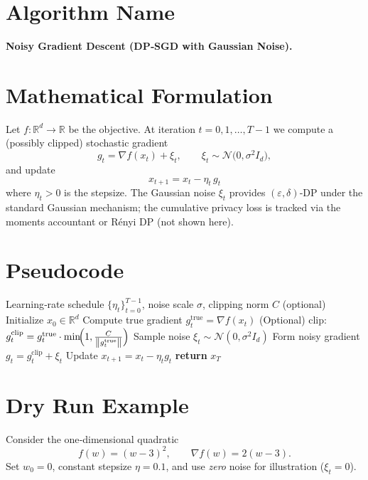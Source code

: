 \documentclass[11pt]{article}
\newcommand{\R}{\mathbb{R}}
\newcommand{\norm}[1]{\left\lVert #1 \right\rVert}
\begin{document}
\section*{Algorithm Name}
\textbf{Noisy Gradient Descent (DP‑SGD with Gaussian Noise).}

\section*{Mathematical Formulation}
Let $f:\R^{d}\rightarrow\R$ be the objective.  
At iteration $t=0,1,\dots,T-1$ we compute a (possibly clipped) stochastic gradient  
\[
g_{t}= \nabla f(x_{t}) + \xi_{t},\qquad 
\xi_{t}\sim\mathcal N\!\bigl(0,\sigma^{2} I_{d}\bigr),
\]
and update
\begin{equation}
\boxed{\,x_{t+1}=x_{t}-\eta_{t}\,g_{t}\,} \label{eq:update}
\end{equation}
where $\eta_{t}>0$ is the stepsize.  
The Gaussian noise $\xi_{t}$ provides $(\varepsilon,\delta)$‑DP under the standard
Gaussian mechanism; the cumulative privacy loss is tracked via the moments accountant
or Rényi DP (not shown here).

\section*{Pseudocode}
\begin{algorithm}[H]
\caption{Noisy Gradient Descent (DP‑SGD)}\label{alg:dp-sgd}
\begin{algorithmic}[1]
\Require Learning‑rate schedule $\{\eta_{t}\}_{t=0}^{T-1}$, noise scale $\sigma$, clipping norm $C$ (optional)
\State Initialize $x_{0}\in\R^{d}$
    \State Compute true gradient $g^{\text{true}}_{t}= \nabla f(x_{t})$
    \State (Optional) clip: $g^{\text{clip}}_{t}= g^{\text{true}}_{t}\cdot\min\!\Bigl(1,\frac{C}{\norm{g^{\text{true}}_{t}}}\Bigr)$
    \State Sample noise $\xi_{t}\sim\mathcal N(0,\sigma^{2}I_{d})$
    \State Form noisy gradient $g_{t}= g^{\text{clip}}_{t}+ \xi_{t}$
    \State Update $x_{t+1}=x_{t}-\eta_{t} g_{t}$   
\EndFor
\State \textbf{return} $x_{T}$
\end{algorithmic}
\end{algorithm}

\section*{Dry Run Example}
Consider the one‑dimensional quadratic
\[
f(w)=(w-3)^{2},\qquad \nabla f(w)=2(w-3).
\]
Set $w_{0}=0$, constant stepsize $\eta=0.1$, and use \emph{zero} noise for illustration
($\xi_{t}=0$).  
\end{document}

